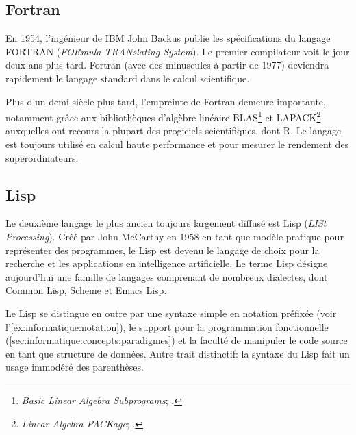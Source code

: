 \subsection{Fortran}
\label{sec:informatique:historique:fortran}

En 1954, l'ingénieur de IBM John Backus publie les spécifications du
langage FORTRAN (\emph{FORmula TRANslating System}). Le
premier compilateur voit le jour deux ans plus tard. Fortran (avec des
minuscules à partir de 1977) deviendra rapidement le langage standard
dans le calcul scientifique.

Plus d'un demi-siècle plus tard, l'empreinte de Fortran demeure
importante, notamment grâce aux bibliothèques d'algèbre linéaire
BLAS\footnote{%
  \emph{Basic Linear Algebra Subprograms};
  .} %
et LAPACK\footnote{%
  \emph{Linear Algebra PACKage};
  .} %
auxquelles ont recours la plupart des progiciels scientifiques, dont
R. Le langage est toujours utilisé en calcul haute performance et pour
mesurer le rendement des superordinateurs.


\subsection{Lisp}
\label{sec:informatique:historique:lisp}

Le deuxième langage le plus ancien toujours largement diffusé est
Lisp (\emph{LISt Processing}). Créé par John McCarthy en
1958 en tant que modèle pratique pour représenter des programmes, le
Lisp est devenu le langage de choix pour la recherche et les
applications en intelligence artificielle. Le terme Lisp désigne
aujourd'hui une famille de langages comprenant de nombreux dialectes,
dont Common Lisp, Scheme et Emacs Lisp.

Le Lisp se distingue en outre par une syntaxe simple en
notation préfixée (voir
l'\autoref{ex:informatique:notation}), le support pour la
programmation fonctionnelle
(\autoref{sec:informatique:concepts:paradigmes}) et la faculté de
manipuler le code source en tant que structure de données. Autre trait
distinctif: la syntaxe du Lisp fait un usage immodéré des parenthèses.

